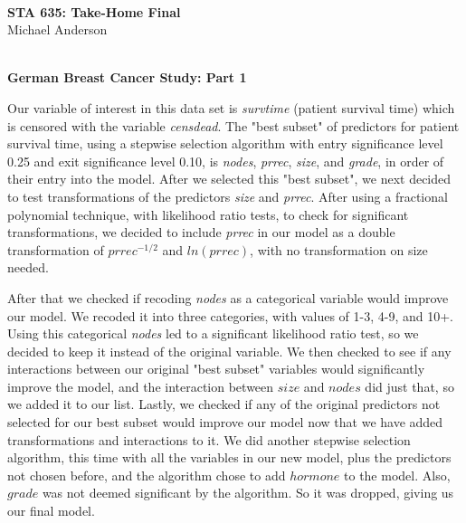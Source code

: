 \documentclass[11pt,letterpaper]{article}
\begin{document}
\pagestyle{plain}
\begin{center}
\hrulefill\\
{\Large \textbf{STA 635: Take-Home Final}}\\
\vspace{0.3cm}
{\color{black}Michael Anderson}\\
\hrulefill\\
\end{center}

\begin{center}
\textbf{German Breast Cancer Study: Part 1}\\
\end{center}

\par

Our variable of interest in this data set is \textit{survtime} (patient survival time) which is censored with the variable \textit{censdead}. The "best subset" of predictors for patient survival time, using a stepwise selection algorithm with entry significance level 0.25 and exit significance level 0.10, is \textit{nodes}, \textit{prrec}, \textit{size}, and \textit{grade}, in order of their entry into the model. After we selected this "best subset", we next decided to test transformations of the predictors \textit{size} and \textit{prrec}. After using a fractional polynomial technique, with likelihood ratio tests, to check for significant transformations, we decided to include \textit{prrec} in our model as a double transformation of $prrec^{-1/2}$ and $ln(prrec)$, with no transformation on size needed. 

\par

After that we checked if recoding \textit{nodes} as a categorical variable would improve our model. We recoded it into three categories, with values of 1-3, 4-9, and 10+. Using this categorical \textit{nodes} led to a significant likelihood ratio test, so we decided to keep it instead of the original variable. We then checked to see if any interactions between our original "best subset" variables would significantly improve the model, and the interaction between $size$ and $nodes$ did just that, so we added it to our list. Lastly, we checked if any of the original predictors not selected for our best subset would improve our model now that we have added transformations and interactions to it. We did another stepwise selection algorithm, this time with all the variables in our new model, plus the predictors not chosen before, and the algorithm chose to add $hormone$ to the model. Also, $grade$ was not deemed significant by the algorithm. So it was dropped, giving us our final model.
\end{document}
